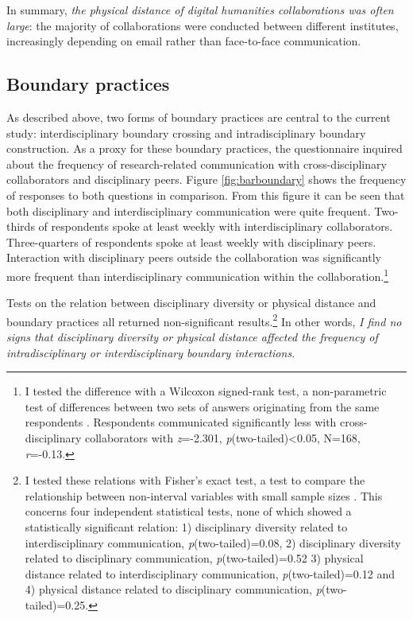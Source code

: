 \documentclass{article}
\begin{document}
In summary, \textit{the physical distance of digital humanities collaborations was often large}: the majority of collaborations were conducted between different institutes, increasingly depending on email rather than face-to-face communication.

\subsection{Boundary practices}
As described above, two forms of boundary practices are central to the current study: interdisciplinary boundary crossing and intradisciplinary boundary construction. 
As a proxy for these boundary practices, the questionnaire inquired about the frequency of research-related communication with cross-disciplinary collaborators and disciplinary peers.
Figure \ref{fig:barboundary} shows the frequency of responses to both questions in comparison.
From this figure it can be seen that both disciplinary and interdisciplinary communication were quite frequent. Two-thirds of respondents spoke at least weekly with interdisciplinary collaborators. Three-quarters of respondents spoke at least weekly with disciplinary peers.
Interaction with disciplinary peers outside the collaboration was significantly more frequent than interdisciplinary communication within the collaboration.\footnote{I tested the difference with a Wilcoxon signed-rank test, a non-parametric test of differences between two sets of answers originating from the same respondents \citep[pp. 552-558]{Field2009}. Respondents communicated significantly less with cross-disciplinary collaborators with \textit{z}=-2.301, \textit{p}(two-tailed)\textless0.05, N=168, \textit{r}=-0.13.}

Tests on the relation between disciplinary diversity or physical distance and boundary practices all returned non-significant results.\footnote{I tested these relations with Fisher's exact test, a test to compare the relationship between non-interval variables with small sample sizes \citep[p. 690]{Field2009}. This concerns four independent statistical tests, none of which showed a statistically significant relation:
1) disciplinary diversity related to interdisciplinary communication, \textit{p}(two-tailed)=0.08, 2) disciplinary diversity related to disciplinary communication, \textit{p}(two-tailed)=0.52 3) physical distance related to interdisciplinary communication, \textit{p}(two-tailed)=0.12 and 4) physical distance related to disciplinary communication, \textit{p}(two-tailed)=0.25.
}
In other words, \textit{I find no signs that disciplinary diversity or physical distance affected the frequency of intradisciplinary or interdisciplinary boundary interactions}.
\end{document}
